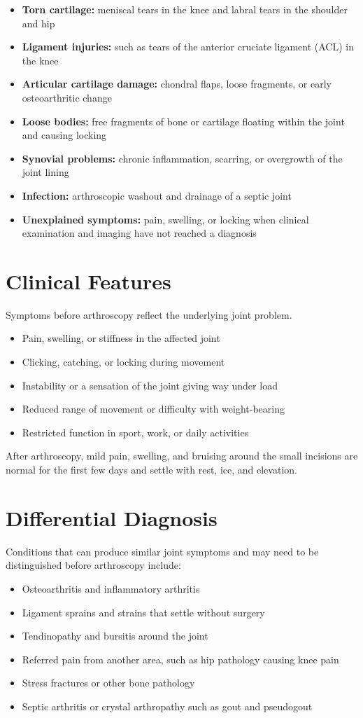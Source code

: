 \begin{itemize}
    \item \textbf{Torn cartilage:} meniscal tears in the knee and labral tears in the shoulder and hip
    \item \textbf{Ligament injuries:} such as tears of the anterior cruciate ligament (ACL) in the knee
    \item \textbf{Articular cartilage damage:} chondral flaps, loose fragments, or early osteoarthritic change
    \item \textbf{Loose bodies:} free fragments of bone or cartilage floating within the joint and causing locking
    \item \textbf{Synovial problems:} chronic inflammation, scarring, or overgrowth of the joint lining
    \item \textbf{Infection:} arthroscopic washout and drainage of a septic joint
    \item \textbf{Unexplained symptoms:} pain, swelling, or locking when clinical examination and imaging have not reached a diagnosis
\end{itemize}

\section*{Clinical Features}
Symptoms before arthroscopy reflect the underlying joint problem.
\begin{itemize}
    \item Pain, swelling, or stiffness in the affected joint
    \item Clicking, catching, or locking during movement
    \item Instability or a sensation of the joint giving way under load
    \item Reduced range of movement or difficulty with weight-bearing
    \item Restricted function in sport, work, or daily activities
\end{itemize}

After arthroscopy, mild pain, swelling, and bruising around the small incisions are normal for the first few days and settle with rest, ice, and elevation.

\section*{Differential Diagnosis}
Conditions that can produce similar joint symptoms and may need to be distinguished before arthroscopy include:
\begin{itemize}
    \item Osteoarthritis and inflammatory arthritis
    \item Ligament sprains and strains that settle without surgery
    \item Tendinopathy and bursitis around the joint
    \item Referred pain from another area, such as hip pathology causing knee pain
    \item Stress fractures or other bone pathology
    \item Septic arthritis or crystal arthropathy such as gout and pseudogout
\end{itemize}

